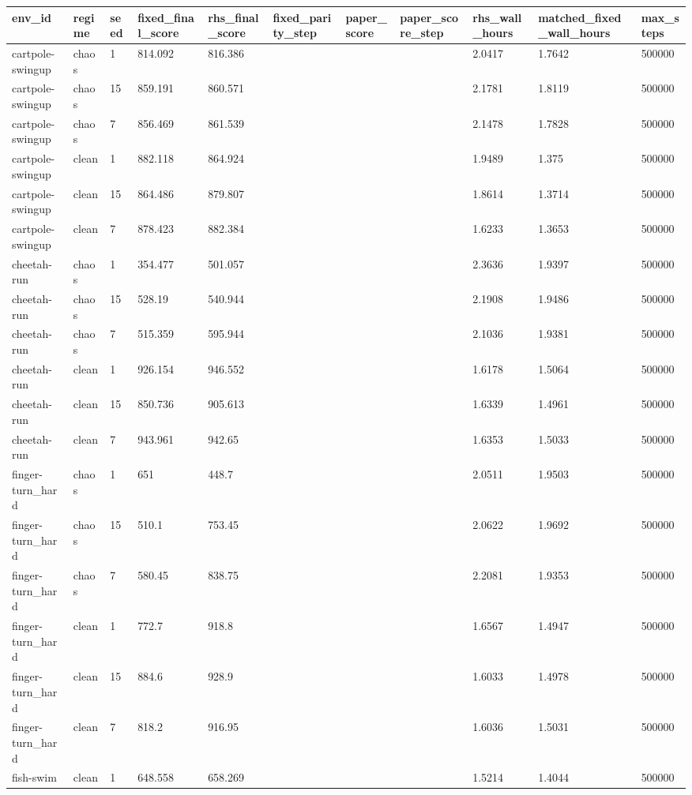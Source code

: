 \begin{tabular}{lllllllllll}
\toprule
env\_id & regime & seed & fixed\_final\_score & rhs\_final\_score & fixed\_parity\_step & paper\_score & paper\_score\_step & rhs\_wall\_hours & matched\_fixed\_wall\_hours & max\_steps \\
\midrule
cartpole-swingup & chaos & 1 & 814.092 & 816.386 &  &  &  & 2.0417 & 1.7642 & 500000 \\
cartpole-swingup & chaos & 15 & 859.191 & 860.571 &  &  &  & 2.1781 & 1.8119 & 500000 \\
cartpole-swingup & chaos & 7 & 856.469 & 861.539 &  &  &  & 2.1478 & 1.7828 & 500000 \\
cartpole-swingup & clean & 1 & 882.118 & 864.924 &  &  &  & 1.9489 & 1.375 & 500000 \\
cartpole-swingup & clean & 15 & 864.486 & 879.807 &  &  &  & 1.8614 & 1.3714 & 500000 \\
cartpole-swingup & clean & 7 & 878.423 & 882.384 &  &  &  & 1.6233 & 1.3653 & 500000 \\
cheetah-run & chaos & 1 & 354.477 & 501.057 &  &  &  & 2.3636 & 1.9397 & 500000 \\
cheetah-run & chaos & 15 & 528.19 & 540.944 &  &  &  & 2.1908 & 1.9486 & 500000 \\
cheetah-run & chaos & 7 & 515.359 & 595.944 &  &  &  & 2.1036 & 1.9381 & 500000 \\
cheetah-run & clean & 1 & 926.154 & 946.552 &  &  &  & 1.6178 & 1.5064 & 500000 \\
cheetah-run & clean & 15 & 850.736 & 905.613 &  &  &  & 1.6339 & 1.4961 & 500000 \\
cheetah-run & clean & 7 & 943.961 & 942.65 &  &  &  & 1.6353 & 1.5033 & 500000 \\
finger-turn\_hard & chaos & 1 & 651 & 448.7 &  &  &  & 2.0511 & 1.9503 & 500000 \\
finger-turn\_hard & chaos & 15 & 510.1 & 753.45 &  &  &  & 2.0622 & 1.9692 & 500000 \\
finger-turn\_hard & chaos & 7 & 580.45 & 838.75 &  &  &  & 2.2081 & 1.9353 & 500000 \\
finger-turn\_hard & clean & 1 & 772.7 & 918.8 &  &  &  & 1.6567 & 1.4947 & 500000 \\
finger-turn\_hard & clean & 15 & 884.6 & 928.9 &  &  &  & 1.6033 & 1.4978 & 500000 \\
finger-turn\_hard & clean & 7 & 818.2 & 916.95 &  &  &  & 1.6036 & 1.5031 & 500000 \\
fish-swim & clean & 1 & 648.558 & 658.269 &  &  &  & 1.5214 & 1.4044 & 500000 \\

\end{tabular}
